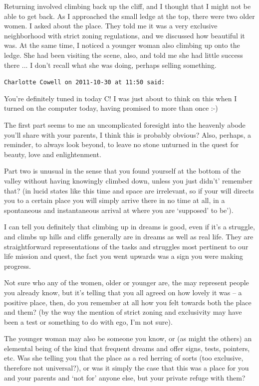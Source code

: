 \begin{footnotesize}
\begin{sffamily}
Returning involved climbing back up the cliff, and I thought that I might not be able to get back. As I approached the small ledge at the top, there were two older women. I asked about the place. They told me it was a very exclusive neighborhood with strict zoning regulations, and we discussed how beautiful it was. At the same time, I noticed a younger woman also climbing up onto the ledge. She had been visiting the scene, also, and told me she had little success there ... I don't recall what she was doing, perhaps selling something.

\hfill

\texttt{Charlotte Cowell on 2011-10-30 at 11:50 said:}

You're definitely tuned in today C! I was just about to think on this when I turned on the computer today, having promised to more than once :-)

The first part seems to me an uncomplicated foresight into the heavenly abode you'll share with your parents, I think this is probably obvious? Also, perhaps, a reminder, to always look beyond, to leave no stone unturned in the quest for beauty, love and enlightenment.

Part two is unusual in the sense that you found yourself at the bottom of the valley without having knowingly climbed down, unless you just didn't' remember that? (in lucid states like this time and space are irrelevant, so if your will directs you to a certain place you will simply arrive there in no time at all, in a spontaneous and instantaneous arrival at where you are `supposed' to be').

I can tell you definitely that climbing up in dreams is good, even if it's a struggle, and climbs up hills and cliffs generally are in dreams as well as real life. They are straightforward representations of the tasks and struggles most pertinent to our life mission and quest, the fact you went upwards was a sign you were making progress.

Not sure who any of the women, older or younger are, the may represent people you already know, but it's telling that you all agreed on how lovely it was -- a positive place, then, do you remember at all how you felt towards both the place and them? (by the way the mention of strict zoning and exclusivity may have been a test or something to do with ego, I'm not sure).

The younger woman may also be someone you know, or (as might the others) an elemental being of the kind that frequent dreams and offer signs, tests, pointers, etc. Was she telling you that the place as a red herring of sorts (too exclusive, therefore not universal?), or was it simply the case that this was a place for you and your parents and `not for' anyone else, but your private refuge with them?


\end{sffamily}
\end{footnotesize}
